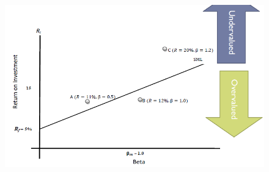 \documentclass[11pt,a4paper]{report}
\begin{document}
\begin{itemize}
\begin{figure}[h]
        \centering
        \includegraphics[width=\textwidth]{images/security selection.png}
    \end{figure}
\end{itemize}
\end{document}

